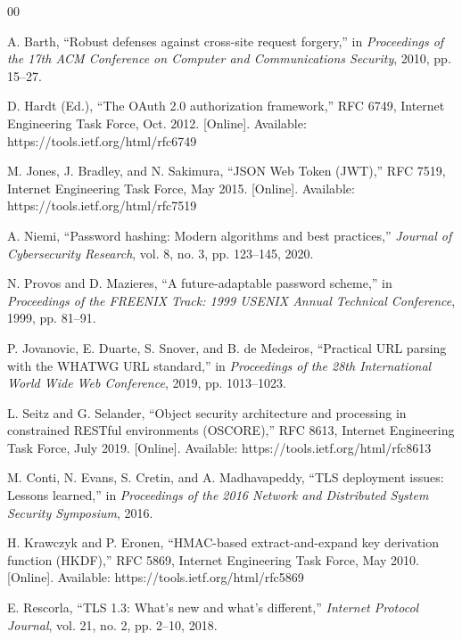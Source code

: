 \documentclass[conference]{IEEEtran}
\begin{document}
\begin{thebibliography}{00}

 A. Barth, ``Robust defenses against cross-site request forgery,'' in \textit{Proceedings of the 17th ACM Conference on Computer and Communications Security}, 2010, pp. 15--27.

 D. Hardt (Ed.), ``The OAuth 2.0 authorization framework,'' RFC 6749, Internet Engineering Task Force, Oct. 2012. [Online]. Available: https://tools.ietf.org/html/rfc6749

 M. Jones, J. Bradley, and N. Sakimura, ``JSON Web Token (JWT),'' RFC 7519, Internet Engineering Task Force, May 2015. [Online]. Available: https://tools.ietf.org/html/rfc7519

 A. Niemi, ``Password hashing: Modern algorithms and best practices,'' \textit{Journal of Cybersecurity Research}, vol. 8, no. 3, pp. 123--145, 2020.

 N. Provos and D. Mazieres, ``A future-adaptable password scheme,'' in \textit{Proceedings of the FREENIX Track: 1999 USENIX Annual Technical Conference}, 1999, pp. 81--91.

 P. Jovanovic, E. Duarte, S. Snover, and B. de Medeiros, ``Practical URL parsing with the WHATWG URL standard,'' in \textit{Proceedings of the 28th International World Wide Web Conference}, 2019, pp. 1013--1023.

 L. Seitz and G. Selander, ``Object security architecture and processing in constrained RESTful environments (OSCORE),'' RFC 8613, Internet Engineering Task Force, July 2019. [Online]. Available: https://tools.ietf.org/html/rfc8613

 M. Conti, N. Evans, S. Cretin, and A. Madhavapeddy, ``TLS deployment issues: Lessons learned,'' in \textit{Proceedings of the 2016 Network and Distributed System Security Symposium}, 2016.

 H. Krawczyk and P. Eronen, ``HMAC-based extract-and-expand key derivation function (HKDF),'' RFC 5869, Internet Engineering Task Force, May 2010. [Online]. Available: https://tools.ietf.org/html/rfc5869

 E. Rescorla, ``TLS 1.3: What's new and what's different,'' \textit{Internet Protocol Journal}, vol. 21, no. 2, pp. 2--10, 2018.

\end{thebibliography}

\vspace{12pt}
\end{document}

